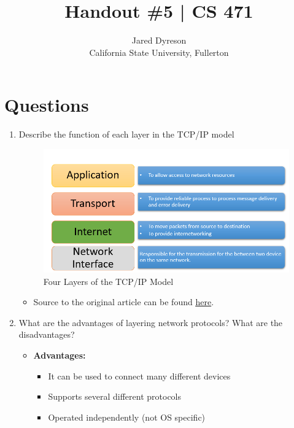 \documentclass{article}
\title{Handout \#5 | CS 471}
\author{Jared Dyreson\\ 
        California State University, Fullerton}
\begin{document}
\maketitle
\tableofcontents

\newpage

\section{Questions}

\begin{enumerate}

\item Describe the function of each layer in the TCP/IP model

\begin{figure}[!h]
\centering
\includegraphics[width=13cm]{TCP_Model}
\caption{Four Layers of the TCP/IP Model}
\end{figure}

\begin{itemize}
\item Source to the original article can be found \href{https://www.guru99.com/tcp-ip-model.html}{\underline{here}}.
\end{itemize}

\item What are the advantages of layering network protocols? What are the disadvantages?

\begin{itemize}
\item \textbf{Advantages:} 

\begin{itemize}
\item It can be used to connect many different devices
\item Supports several different protocols
\item Operated independently (not OS specific)
\end{itemize}


\end{itemize}
\end{enumerate}
\end{document}
